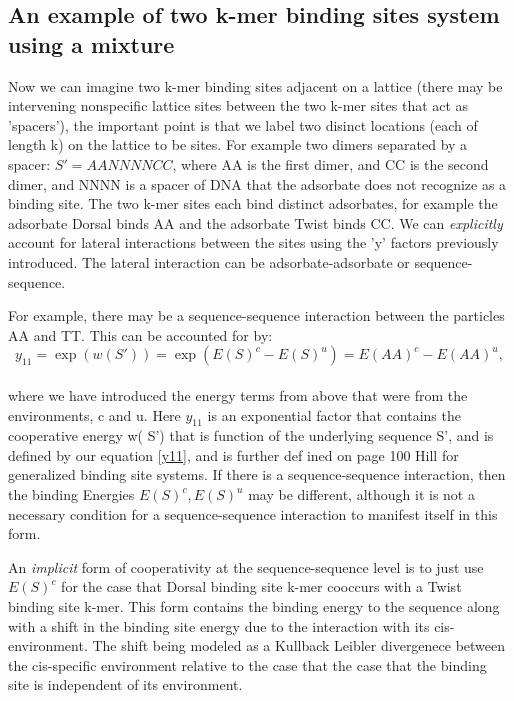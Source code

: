 \subsection*{An example of two k-mer binding sites system using a mixture}
Now we can imagine two k-mer binding sites adjacent on a lattice (there may be intervening nonspecific lattice sites between the two k-mer sites that act as 'spacers'), the important point is that we label two disinct locations (each of length k) on the lattice to be sites.  For example two dimers separated by a spacer: $S'= AANNNNCC$, where AA is the first dimer, and CC is the second dimer, and NNNN is a spacer of DNA that the adsorbate does not recognize as a binding site.  The two k-mer sites each bind distinct adsorbates, for example the adsorbate Dorsal binds AA and the adsorbate Twist binds CC.  We can \textit{explicitly} account for lateral interactions between the sites using the 'y' factors previously introduced.  The lateral interaction can be adsorbate-adsorbate or sequence-sequence.

For example, there may be a sequence-sequence interaction between the particles AA and TT.  This can be accounted for by:
\begin{equation}\label{}
  y_{11} =\exp( w(S') ) = \exp( E(S)^c - E(S)^u )= E(AA)^c-E(AA)^u,
\end{equation}
\\
where we have introduced the energy terms from above that were from the environments, c and u. Here $y_{11}$ is an exponential factor that contains the cooperative energy w(
S') that is function of the underlying sequence S', and is defined by our equation \eqref{y11}, and is further def
ined on page 100 Hill for generalized binding site systems.  If there is a sequence-sequence interaction, then the binding Energies $E(S)^c, E(S)^u$ may be different, although it is not a necessary condition for a sequence-sequence interaction to manifest itself in this form.

An \textit{implicit} form of cooperativity at the sequence-sequence level is to just use $E(S)^c$ for the case that Dorsal binding site k-mer cooccurs with a Twist binding site k-mer.  This form contains the binding energy to the sequence along with a shift in the binding site energy due to the interaction with its cis-environment.  The shift being modeled as a Kullback Leibler divergenece between the cis-specific environment relative to the case that the case that the binding site is independent of its environment.
